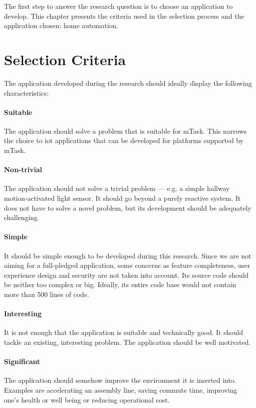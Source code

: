The first step to answer the research question is to choose an application to develop. This chapter presents the criteria used in the selection process and the application chosen: home automation.

\section{Selection Criteria}\label{sec:selec_cri}

The application developed during the research should ideally display the following characteristics:

\paragraph{Suitable} The application should solve a problem that is suitable for mTask. This narrows the choice to \ac{iot} applications that can be developed for platforms supported by mTask.

\paragraph{Non-trivial} The application should not solve a trivial problem --- e.g. a simple hallway  motion-activated light sensor. It should go beyond a purely reactive system. It does not have to solve a novel problem, but its development should be adequately challenging.

\paragraph{Simple} It should be simple enough to be developed during this research. Since we are not aiming for a full-pledged application, some concerns as feature completeness, user experience design and security are not taken into account. Its source code should be neither too complex or big. Ideally, its entire code base would not contain more than 500 lines of code. 

\paragraph{Interesting} It is not enough that the application is suitable and technically good. It should tackle an existing, interesting problem. The application should be well motivated.

\paragraph{Significant} The application should somehow improve the environment it is inserted into. Examples are accelerating an assembly line, saving commute  time, improving one's health or well being or reducing operational cost.

